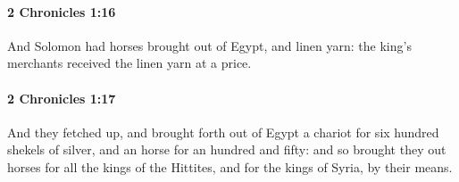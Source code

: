 		\paragraph{2 Chronicles 1:16} %
			\label{2CHRONICLES-1-16}

			And Solomon had horses brought out of Egypt, and linen yarn: the king's merchants received the linen yarn at a price.


		\paragraph{2 Chronicles 1:17} %
			\label{2CHRONICLES-1-17}

			And they fetched up, and brought forth out of Egypt a chariot for six hundred shekels of silver, and an horse for an hundred and fifty: and so brought they out horses for all the kings of the Hittites, and for the kings of Syria, by their means.

